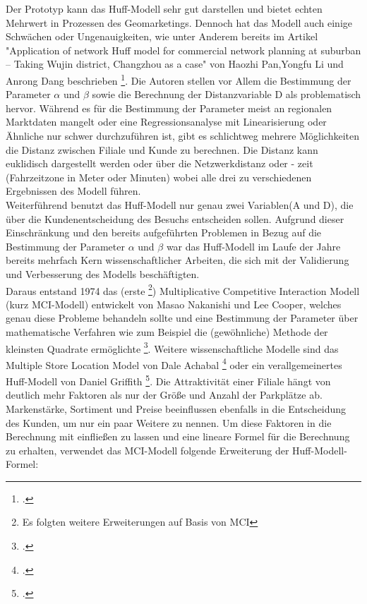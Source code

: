 Der Prototyp kann das Huff-Modell sehr gut darstellen und bietet echten Mehrwert in Prozessen des Geomarketings.
Dennoch hat das Modell auch einige Schwächen oder Ungenauigkeiten, wie unter Anderem bereits im Artikel "Application of network Huff model for commercial network planning at suburban – Taking Wujin district, Changzhou as a case" von Haozhi Pan,Yongfu Li und Anrong Dang beschrieben \footcite{pan_application_2013}.
Die Autoren stellen vor Allem die Bestimmung der Parameter $\alpha$ und $\beta$ sowie die Berechnung der Distanzvariable D als problematisch hervor.
Während es für die Bestimmung der Parameter meist an regionalen Marktdaten mangelt oder eine Regressionsanalyse mit Linearisierung oder Ähnliche  nur schwer durchzuführen ist, gibt es schlichtweg mehrere Möglichkeiten die Distanz zwischen Filiale und Kunde zu berechnen.
Die Distanz kann euklidisch dargestellt werden oder über die Netzwerkdistanz oder - zeit (Fahrzeitzone in Meter oder Minuten) wobei alle drei zu verschiedenen Ergebnissen des Modell führen.\\
Weiterführend benutzt das Huff-Modell nur genau zwei Variablen(A und D), die über die Kundenentscheidung des Besuchs entscheiden sollen.
Aufgrund dieser Einschränkung und den bereits aufgeführten Problemen in Bezug auf die Bestimmung der Parameter $\alpha$ und $\beta$ war das Huff-Modell im Laufe der Jahre bereits mehrfach Kern wissenschaftlicher Arbeiten, die sich mit der Validierung und Verbesserung des Modells beschäftigten.\\
Daraus entstand 1974 das (erste \footnote{Es folgten weitere Erweiterungen auf Basis von MCI}) Multiplicative Competitive Interaction Modell (kurz MCI-Modell) entwickelt von Masao Nakanishi und Lee Cooper, welches genau diese Probleme behandeln sollte und eine Bestimmung der Parameter über mathematische Verfahren wie zum Beispiel die (gewöhnliche) Methode der kleinsten Quadrate ermöglichte \footcite{nakanishi_parameter_1974}. 
Weitere wissenschaftliche Modelle sind das Multiple Store Location Model von Dale Achabal \footcite{achabal_slop_1984} oder ein verallgemeinertes Huff-Modell von Daniel Griffith \footcite{griffith_generalized_1982}.
Die Attraktivität einer Filiale hängt von deutlich mehr Faktoren als nur der Größe und Anzahl der Parkplätze ab.
Markenstärke, Sortiment und Preise beeinflussen ebenfalls in die Entscheidung des Kunden, um nur ein paar Weitere zu nennen.
Um diese Faktoren in die Berechnung mit einfließen zu lassen und eine lineare Formel für die Berechnung zu erhalten, verwendet das MCI-Modell folgende Erweiterung der Huff-Modell-Formel:

